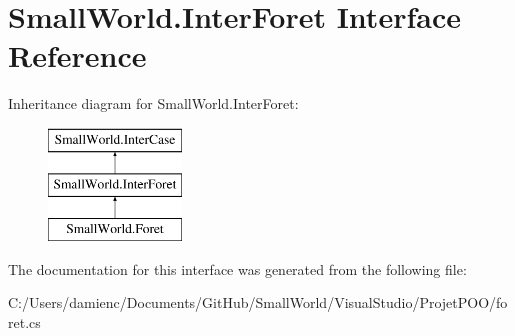 \hypertarget{interface_small_world_1_1_inter_foret}{\section{Small\-World.\-Inter\-Foret Interface Reference}
\label{interface_small_world_1_1_inter_foret}
}
Inheritance diagram for Small\-World.\-Inter\-Foret\-:\begin{figure}[H]
\begin{center}
\leavevmode
\includegraphics[height=3.000000cm]{interface_small_world_1_1_inter_foret}
\end{center}
\end{figure}


The documentation for this interface was generated from the following file\-:\begin{DoxyCompactItemize}
\item 
C\-:/\-Users/damienc/\-Documents/\-Git\-Hub/\-Small\-World/\-Visual\-Studio/\-Projet\-P\-O\-O/foret.\-cs\end{DoxyCompactItemize}
